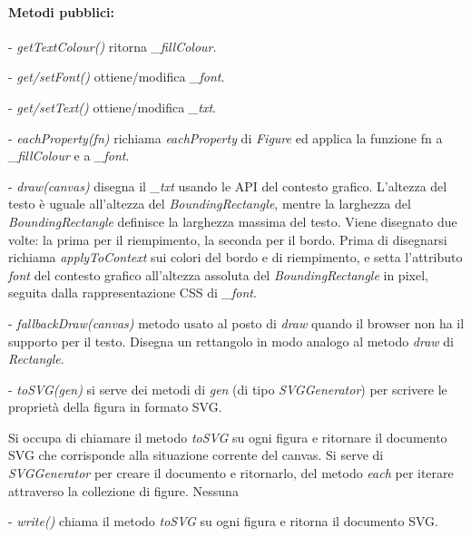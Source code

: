 \paragraph{Metodi pubblici:}
\begin{elencopuntato}[\normindent]
\item[-] \textit{getTextColour()} ritorna \textit{{\_}fillColour}.
\item[-] \textit{get/setFont()} ottiene/modifica \textit{{\_}font}.
\item[-] \textit{get/setText()} ottiene/modifica \textit{{\_}txt}.
\item[-] \textit{eachProperty(fn)} richiama \textit{eachProperty} di \textit{Figure} ed applica la funzione fn a \textit{{\_}fillColour} e a \textit{{\_}font}.
\item[-] \textit{draw(canvas)} disegna il \textit{{\_}txt} usando le API del contesto grafico. L'altezza del testo \`e uguale all'altezza del \textit{BoundingRectangle}, mentre la larghezza del \textit{BoundingRectangle} definisce la larghezza massima del testo. Viene disegnato due volte: la prima per il riempimento, la seconda per il bordo. Prima di disegnarsi richiama \textit{applyToContext} sui colori del bordo e di riempimento, e setta l'attributo \textit{font} del contesto grafico all'altezza assoluta del \textit{BoundingRectangle} in pixel, seguita dalla rappresentazione CSS di \textit{{\_}font}.
\item[-] \textit{fallbackDraw(canvas)} metodo usato al posto di \textit{draw} quando il browser non ha il supporto per il testo. Disegna un rettangolo in modo analogo al metodo \textit{draw} di \textit{Rectangle}.
\item[-] \textit{toSVG(gen)} si serve dei metodi di \textit{gen} (di tipo \textit{SVGGenerator}) per scrivere le propriet\`a della figura in formato SVG.
\end{elencopuntato}


Si occupa di chiamare il metodo \textit{toSVG} su ogni figura e ritornare il documento SVG che corrisponde alla situazione corrente del canvas.
Si serve di \textit{SVGGenerator} per creare il documento e ritornarlo, del metodo \textit{each} per iterare attraverso la collezione di figure.
Nessuna
\begin{elencopuntato}[\normindent]
\item[-]  \textit{write()} chiama il metodo \textit{toSVG} su ogni figura e ritorna il documento SVG.
\end{elencopuntato}

